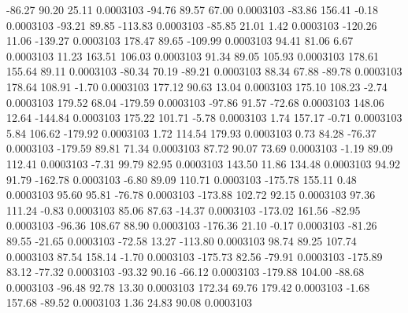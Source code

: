       -86.27       90.20       25.11     0.0003103
      -94.76       89.57       67.00     0.0003103
      -83.86      156.41       -0.18     0.0003103
      -93.21       89.85     -113.83     0.0003103
      -85.85       21.01        1.42     0.0003103
     -120.26       11.06     -139.27     0.0003103
      178.47       89.65     -109.99     0.0003103
       94.41       81.06        6.67     0.0003103
       11.23      163.51      106.03     0.0003103
       91.34       89.05      105.93     0.0003103
      178.61      155.64       89.11     0.0003103
      -80.34       70.19      -89.21     0.0003103
       88.34       67.88      -89.78     0.0003103
      178.64      108.91       -1.70     0.0003103
      177.12       90.63       13.04     0.0003103
      175.10      108.23       -2.74     0.0003103
      179.52       68.04     -179.59     0.0003103
      -97.86       91.57      -72.68     0.0003103
      148.06       12.64     -144.84     0.0003103
      175.22      101.71       -5.78     0.0003103
        1.74      157.17       -0.71     0.0003103
        5.84      106.62     -179.92     0.0003103
        1.72      114.54      179.93     0.0003103
        0.73       84.28      -76.37     0.0003103
     -179.59       89.81       71.34     0.0003103
       87.72       90.07       73.69     0.0003103
       -1.19       89.09      112.41     0.0003103
       -7.31       99.79       82.95     0.0003103
      143.50       11.86      134.48     0.0003103
       94.92       91.79     -162.78     0.0003103
       -6.80       89.09      110.71     0.0003103
     -175.78      155.11        0.48     0.0003103
       95.60       95.81      -76.78     0.0003103
     -173.88      102.72       92.15     0.0003103
       97.36      111.24       -0.83     0.0003103
       85.06       87.63      -14.37     0.0003103
     -173.02      161.56      -82.95     0.0003103
      -96.36      108.67       88.90     0.0003103
     -176.36       21.10       -0.17     0.0003103
      -81.26       89.55      -21.65     0.0003103
      -72.58       13.27     -113.80     0.0003103
       98.74       89.25      107.74     0.0003103
       87.54      158.14       -1.70     0.0003103
     -175.73       82.56      -79.91     0.0003103
     -175.89       83.12      -77.32     0.0003103
      -93.32       90.16      -66.12     0.0003103
     -179.88      104.00      -88.68     0.0003103
      -96.48       92.78       13.30     0.0003103
      172.34       69.76      179.42     0.0003103
       -1.68      157.68      -89.52     0.0003103
        1.36       24.83       90.08     0.0003103
